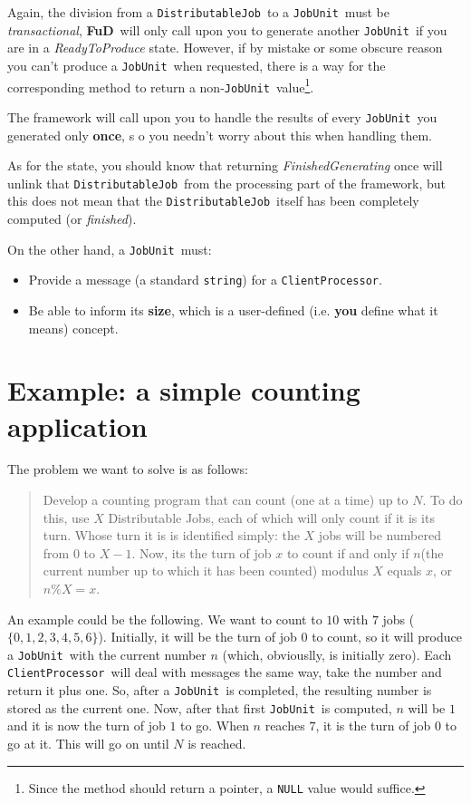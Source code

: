 \documentclass[a4paper,12pt,english]{article}
\newcommand{\fud}{\textbf{FuD}}
\renewcommand{\DJ}{\texttt{DistributableJob}}
\newcommand{\JU}{\texttt{JobUnit}}
\newcommand{\CP}{\texttt{ClientProcessor}}
\begin{document}
Again, the division from a \DJ \ to a \JU \ must be \emph{transactional}, \fud \ will only call upon you to generate another \JU \ if you are in a \emph{ReadyToProduce} state. However, if by mistake or some obscure reason you can't produce a \JU \ when requested, there is a way for the corresponding method to return a non-\JU \ value\footnote{Since the method should return a pointer, a \texttt{NULL} value would suffice.}. 

The framework will call upon you to  handle the results of every \JU \ you generated only \textbf{once}, s  o you needn't worry about this when handling them.

As for the state, you should know that returning \emph{FinishedGenerating} once will unlink that \DJ \ from the processing part of the framework, but this does not mean that the \DJ \ itself has been completely computed (or \emph{finished}). 

On the other hand, a \JU \ must:
\begin{itemize}
\item Provide a message (a standard \texttt{string}) for a \CP.
\item Be able to inform its \textbf{size}, which is a user-defined (i.e. \textbf{you} define what it means) concept.
\end{itemize}

\section{Example: a simple counting application}

The problem we want to solve is as follows:

\begin{quote}
Develop a counting program that can count (one at a time) up to $N$. To do this, use $X$ Distributable Jobs, each of which will only count if it is its turn. Whose turn it is is identified simply: the $X$ jobs will be numbered from $0$ to $X-1$. Now, its the turn of job $x$ to count if and only if $n$(the current number up to which it has been counted) modulus $X$ equals $x$, or $n \% X = x$.
\end{quote}

An example could be the following. We want to count to $10$ with $7$ jobs ($\{0,1,2,3,4,5,6\}$). Initially, it will be the turn of job $0$ to count, so it will produce a \JU \ with the current number $n$ (which, obviouslly, is initially zero). Each \CP \ will deal with messages the same way, take the number and return it plus one. So, after a \JU \ is completed, the resulting number is stored as the current one. Now, after that first \JU \ is computed, $n$ will be $1$ and it is now the turn of job $1$ to go. When $n$ reaches $7$, it is the turn of job $0$ to go at it. This will go on until $N$ is reached.
\end{document}
